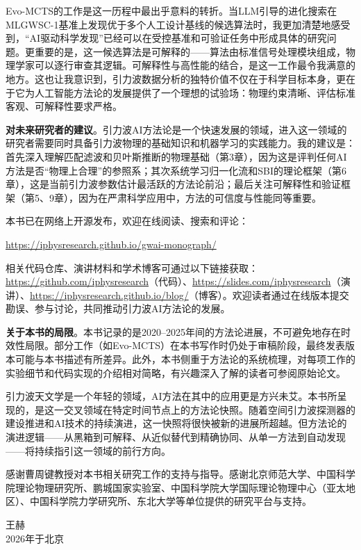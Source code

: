 Evo-MCTS的工作是这一历程中最出乎意料的转折。当LLM引导的进化搜索在MLGWSC-1基准上发现优于多个人工设计基线的候选算法时，我更加清楚地感受到，“AI驱动科学发现”已经可以在受控基准和可验证任务中形成具体的研究问题。更重要的是，这一候选算法是可解释的——算法由标准信号处理模块组成，物理学家可以逐行审查其逻辑。可解释性与高性能的结合，是这一工作最令我满意的地方。这也让我意识到，引力波数据分析的独特价值不仅在于科学目标本身，更在于它为人工智能方法论的发展提供了一个理想的试验场：物理约束清晰、评估标准客观、可解释性要求严格。

\textbf{对未来研究者的建议}。引力波AI方法论是一个快速发展的领域，进入这一领域的研究者需要同时具备引力波物理的基础知识和机器学习的实践能力。我的建议是：首先深入理解匹配滤波和贝叶斯推断的物理基础（第3章），因为这是评判任何AI方法是否“物理上合理”的参照系；其次系统学习归一化流和SBI的理论框架（第6章），这是当前引力波参数估计最活跃的方法论前沿；最后关注可解释性和验证框架（第5、9章），因为在严肃科学应用中，方法的可信度与性能同等重要。

本书已在网络上开源发布，欢迎在线阅读、搜索和评论：
\begin{center}
\url{https://iphysresearch.github.io/gwai-monograph/}
\end{center}
相关代码仓库、演讲材料和学术博客可通过以下链接获取：\url{https://github.com/iphysresearch}（代码）、\url{https://slides.com/iphysresearch}（演讲）、\url{https://iphysresearch.github.io/blog/}（博客）。欢迎读者通过在线版本提交勘误、参与讨论，共同推动引力波AI方法论的发展。

\textbf{关于本书的局限}。本书记录的是2020--2025年间的方法论进展，不可避免地存在时效性局限。部分工作（如Evo-MCTS）在本书写作时仍处于审稿阶段，最终发表版本可能与本书描述有所差异。此外，本书侧重于方法论的系统梳理，对每项工作的实验细节和代码实现的介绍相对简略，有兴趣深入了解的读者可参阅原始论文。

引力波天文学是一个年轻的领域，AI方法在其中的应用更是方兴未艾。本书所呈现的，是这一交叉领域在特定时间节点上的方法论快照。随着空间引力波探测器的建设推进和AI技术的持续演进，这一快照将很快被新的进展所超越。但方法论的演进逻辑——从黑箱到可解释、从近似替代到精确协同、从单一方法到自动发现——将持续指引这一领域的前行方向。

感谢曹周键教授对本书相关研究工作的支持与指导。感谢北京师范大学、中国科学院理论物理研究所、鹏城国家实验室、中国科学院大学国际理论物理中心（亚太地区）、中国科学院力学研究所、东北大学等单位提供的研究平台与支持。

\vspace{2em}
\begin{flushright}
王赫\\
2026年于北京
\end{flushright}
